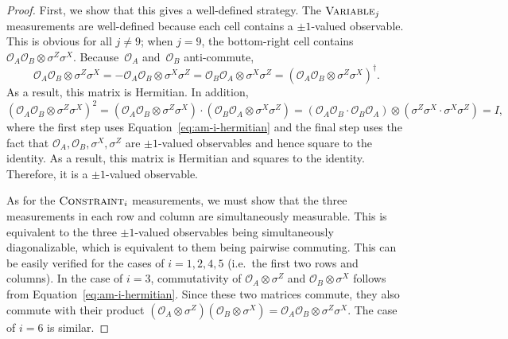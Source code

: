 \documentclass[11pt]{article}
\theoremstyle{definition}
\newcommand{\typestyle}[1]{\ensuremath{\textsc{#1}}\xspace}
\newcommand{\Constraint}{\typestyle{Constraint}}
\newcommand{\Variable}{\typestyle{Variable}}
\renewcommand{\cal}[1]{\mathcal{#1}}
\begin{document}
\begin{proof}
  First, we show that this gives a well-defined strategy.
  The $\Variable_j$ measurements are well-defined because each cell contains a
  $\pm 1$-valued observable.
  This is obvious for all $j \neq 9$; when $j = 9$, the bottom-right cell
  contains $\cal{O}_A \cal{O}_B \otimes \sigma^Z \sigma^X$.
  Because~$\cal{O}_A$ and~$\cal{O}_B$ anti-commute,
  \begin{equation}\label{eq:am-i-hermitian}
  \cal{O}_A \cal{O}_B \otimes \sigma^Z \sigma^X
  = - \cal{O}_A \cal{O}_B \otimes \sigma^X \sigma^Z
  = \cal{O}_B \cal{O}_A \otimes \sigma^X \sigma^Z
  = (\cal{O}_A \cal{O}_B \otimes \sigma^Z \sigma^X)^\dagger.
  \end{equation}
  As a result, this matrix is Hermitian. In addition, 
  \begin{equation*}
  (\cal{O}_A \cal{O}_B \otimes \sigma^Z \sigma^X)^2
  = (\cal{O}_A \cal{O}_B \otimes \sigma^Z \sigma^X) \cdot (\cal{O}_B \cal{O}_A \otimes \sigma^X \sigma^Z)
  = (\cal{O}_A \cal{O}_B \cdot \cal{O}_B \cal{O}_A) \otimes (\sigma^Z \sigma^X \cdot \sigma^X \sigma^Z)
  = I,
  \end{equation*}
  where the first step uses Equation~\eqref{eq:am-i-hermitian} and the final
  step uses the fact that $\cal{O}_A, \cal{O}_B, \sigma^X, \sigma^Z$ are $\pm
  1$-valued observables and hence square to the identity.
  As a result, this matrix is Hermitian and squares to the identity.
  Therefore, it is a $\pm 1$-valued observable.
  
  As for the $\Constraint_i$ measurements,
  we must show that the three measurements in each row and column are simultaneously measurable.
  This is equivalent to the three $\pm 1$-valued observables being simultaneously diagonalizable,
  which is equivalent to them being pairwise commuting. This can be easily verified for the cases of $i = 1, 2, 4, 5$
  (i.e.\ the first two rows and columns).
  In the case of $i = 3$, commutativity of $\cal{O}_A \otimes \sigma^Z$ and $\cal{O}_B \otimes \sigma^X$ 
  follows from Equation~\eqref{eq:am-i-hermitian}.
  Since these two matrices commute, they also commute with their product 
  $(\cal{O}_A \otimes \sigma^Z)(\cal{O}_B \otimes \sigma^X) = \cal{O}_A \cal{O}_B \otimes \sigma^Z \sigma^X$.
  The case of $i = 6$ is similar.
  

\end{proof}
\end{document}

